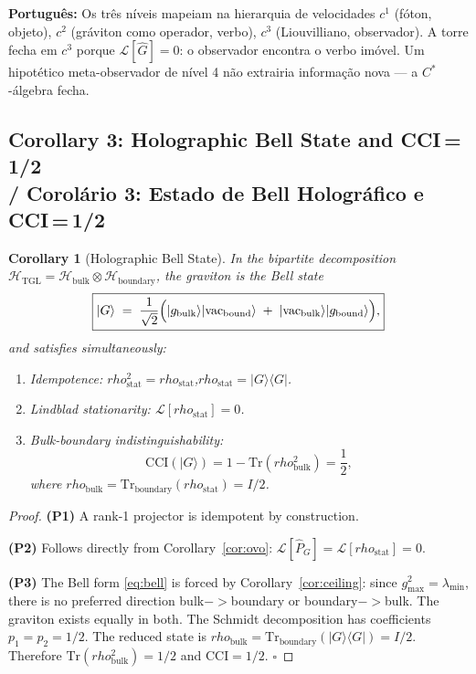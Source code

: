 \documentclass[12pt,a4paper]{article}
\newtheorem{corollary}{Corollary}
\def\to{ -> }%
\def\rho{rho}%
\begin{document}
\textbf{Português:} Os três níveis mapeiam na hierarquia de velocidades $c^1$ (fóton, objeto), $c^2$ (gráviton como operador, verbo), $c^3$ (Liouvilliano, observador). A torre fecha em $c^3$ porque $\mathcal{L}[\hat{G}]=0$: o observador encontra o verbo imóvel. Um hipotético meta-observador de nível 4 não extrairia informação nova --- a $C^*$-álgebra fecha.

\subsection{Corollary 3: Holographic Bell State and CCI\,=\,1/2 \\ / Corolário 3: Estado de Bell Holográfico e CCI\,=\,1/2}

\begin{corollary}[Holographic Bell State]
\label{cor:bell}
In the bipartite decomposition $\mathcal{H}_{\text{TGL}} = \mathcal{H}_{\mathrm{bulk}} \otimes \mathcal{H}_{\mathrm{boundary}}$, the graviton is the Bell state
\begin{equation}
\boxed{|G\rangle \;=\; \frac{1}{\sqrt{2}}\Bigl(|g_{\mathrm{bulk}}\rangle|\mathrm{vac}_{\mathrm{bound}}\rangle
\;+\; |\mathrm{vac}_{\mathrm{bulk}}\rangle|g_{\mathrm{bound}}\rangle\Bigr),}
\label{eq:bell}
\end{equation}
and satisfies simultaneously:
\begin{enumerate}
    \item[\textbf{(P1)}] \emph{Idempotence:} $\rho_{\mathrm{stat}}^2 = \rho_{\mathrm{stat}}$,\quad $\rho_{\mathrm{stat}} = |G\rangle\langle G|$.
    \item[\textbf{(P2)}] \emph{Lindblad stationarity:} $\mathcal{L}[\rho_{\mathrm{stat}}] = 0$.
    \item[\textbf{(P3)}] \emph{Bulk-boundary indistinguishability:}
    \begin{equation}
        \mathrm{CCI}(|G\rangle) = 1 - \mathrm{Tr}(\rho_{\mathrm{bulk}}^2) = \frac{1}{2},
    \end{equation}
    where $\rho_{\mathrm{bulk}} = \mathrm{Tr}_{\mathrm{boundary}}(\rho_{\mathrm{stat}}) = I/2$.
\end{enumerate}
\end{corollary}

\begin{proof}
\textbf{(P1)} A rank-1 projector is idempotent by construction.

\textbf{(P2)} Follows directly from Corollary~\ref{cor:ovo}: $\mathcal{L}[\hat{P}_G] = \mathcal{L}[\rho_{\mathrm{stat}}] = 0$.

\textbf{(P3)} The Bell form \eqref{eq:bell} is forced by Corollary~\ref{cor:ceiling}: since $g_{\max}^2 = \lambda_{\min}$, there is no preferred direction bulk$\to$boundary or boundary$\to$bulk. The graviton exists equally in both. The Schmidt decomposition has coefficients $p_1 = p_2 = 1/2$. The reduced state is $\rho_{\mathrm{bulk}} = \mathrm{Tr}_{\mathrm{boundary}}(|G\rangle\langle G|) = I/2$. Therefore $\mathrm{Tr}(\rho_{\mathrm{bulk}}^2) = 1/2$ and $\mathrm{CCI} = 1/2$. $\square$
\end{proof}
\end{document}
